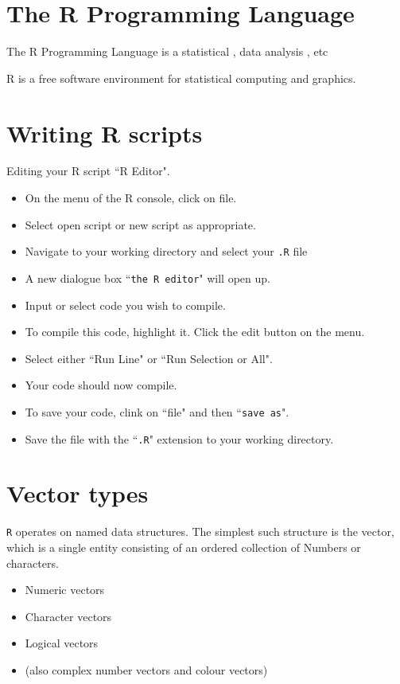 \documentclass[a4paper,12pt]{article}
\begin{document}
	
	\tableofcontents
	\newpage
	\section{The R Programming Language}
	
	The R Programming Language is a statistical , data analysis , etc
	
	R is a free software environment for statistical computing and graphics.
	
	\section{Writing R scripts}
	Editing your R script ``R Editor".
	\begin{itemize}
		\item On the menu of the R console, click on file.
		\item Select open script or new script as appropriate.
		\item Navigate to your working directory and select your \texttt{.R} file
		\item A new dialogue box ``\texttt{the R editor}" will open up.
		\item Input or select code you wish to compile.
		\item To compile this code, highlight it. Click the edit button on the menu.
		\item Select either ``Run Line" or ``Run Selection or All".
		\item Your code should now compile.
		\item To save your code, clink on ``file" and then ``\texttt{save as}".
		\item Save the file with the ``\texttt{.R}" extension to your working directory.
	\end{itemize}
	
	\section{Vector types}
	\texttt{R} operates on named data structures. The simplest such structure is the
	vector, which is a single entity consisting of an ordered collection of
	Numbers or characters.
	
	\begin{itemize}
		\item Numeric vectors
		\item Character vectors
		\item Logical vectors
		\item (also complex number vectors and colour vectors)
	\end{itemize}
	
\end{document}
